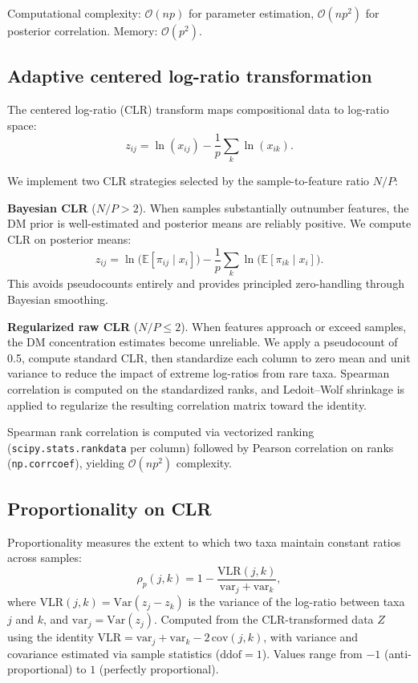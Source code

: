 \documentclass[fleqn]{nature}
\newcommand{\E}{\mathbb{E}}
\newcommand{\calO}{\mathcal{O}}
\newcommand{\Var}{\mathrm{Var}}
\begin{document}
\begin{methods}
Computational complexity: $\calO(np)$ for parameter estimation, $\calO(np^2)$ for posterior correlation. Memory: $\calO(p^2)$.


\subsection*{Adaptive centered log-ratio transformation}

The centered log-ratio (CLR) transform maps compositional data to log-ratio space:
\begin{equation}
z_{ij} = \ln(x_{ij}) - \frac{1}{p}\sum_k \ln(x_{ik}).
\end{equation}

We implement two CLR strategies selected by the sample-to-feature ratio $N/P$:

\textbf{Bayesian CLR} ($N/P > 2$).
When samples substantially outnumber features, the DM prior is well-estimated and posterior means are reliably positive.
We compute CLR on posterior means:
\begin{equation}
z_{ij} = \ln\bigl(\E[\pi_{ij} \mid x_i]\bigr) - \frac{1}{p}\sum_k \ln\bigl(\E[\pi_{ik} \mid x_i]\bigr).
\end{equation}
This avoids pseudocounts entirely and provides principled zero-handling through Bayesian smoothing.

\textbf{Regularized raw CLR} ($N/P \leq 2$).
When features approach or exceed samples, the DM concentration estimates become unreliable.
We apply a pseudocount of 0.5, compute standard CLR, then standardize each column to zero mean and unit variance to reduce the impact of extreme log-ratios from rare taxa.
Spearman correlation is computed on the standardized ranks, and Ledoit--Wolf shrinkage is applied to regularize the resulting correlation matrix toward the identity.

Spearman rank correlation is computed via vectorized ranking (\texttt{scipy.stats.rankdata} per column) followed by Pearson correlation on ranks (\texttt{np.corrcoef}), yielding $\calO(np^2)$ complexity.


\subsection*{Proportionality on CLR}

Proportionality measures the extent to which two taxa maintain constant ratios across samples:
\begin{equation}
\rho_p(j,k) = 1 - \frac{\mathrm{VLR}(j,k)}{\mathrm{var}_j + \mathrm{var}_k},
\end{equation}
where $\mathrm{VLR}(j,k) = \Var(z_j - z_k)$ is the variance of the log-ratio between taxa $j$ and $k$, and $\mathrm{var}_j = \Var(z_j)$.
Computed from the CLR-transformed data $Z$ using the identity $\mathrm{VLR} = \mathrm{var}_j + \mathrm{var}_k - 2\,\mathrm{cov}(j,k)$, with variance and covariance estimated via sample statistics ($\mathrm{ddof}=1$).
Values range from $-1$ (anti-proportional) to $1$ (perfectly proportional).



\end{methods}
\end{document}
